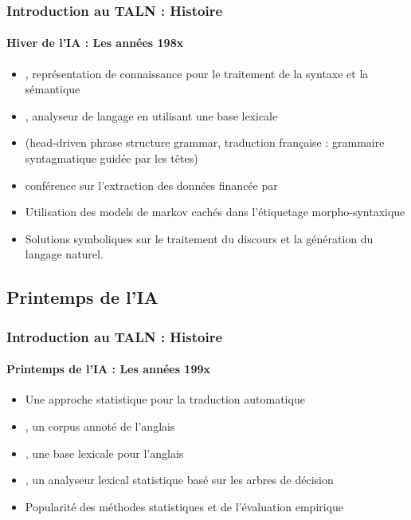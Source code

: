 \documentclass[xcolor=table]{beamer}
\begin{document}
\begin{frame}
\frametitle{Introduction au TALN : Histoire}
\framesubtitle{Hiver de l'IA : Les années 198x}

\begin{itemize}
	\item {} , représentation de connaissance pour le traitement de la syntaxe et la sémantique \cite{1980-bobrow}
	\item {} , analyseur de langage en utilisant une base lexicale \cite{1986-jacobs}
	\item {}  (head-driven phrase structure grammar, traduction française : grammaire syntagmatique guidée par les têtes) \cite{1987-sag-pollard}
	\item {}  conférence sur l'extraction des données financée par 
	\item {} Utilisation des models de markov cachés dans  l'étiquetage morpho-syntaxique \cite{1988-church}
	\item Solutions symboliques sur le traitement du discours et la génération du langage naturel.
\end{itemize}

\end{frame}

\subsection{Printemps de l'IA}

\begin{frame}
\frametitle{Introduction au TALN : Histoire}
\framesubtitle{Printemps de l'IA : Les années 199x}

\begin{itemize}
	\item {} Une approche statistique pour la traduction automatique \cite{1990-brown-al}
	\item {} , un corpus annoté de l'anglais \cite{1993-marcus-al}
	\item {} , une base lexicale pour l'anglais \cite{1995-miller}
	\item {} , un analyseur lexical statistique basé sur les arbres de décision \cite{1996-magerman}
	\item Popularité des méthodes statistiques et de l'évaluation empirique
\end{itemize}

\end{frame}
\end{document}
